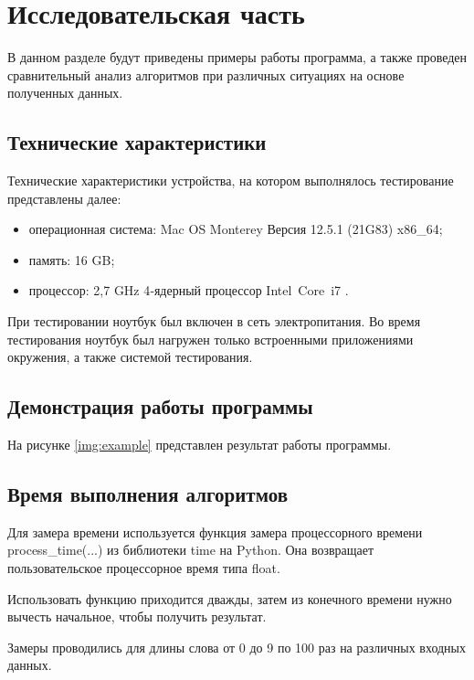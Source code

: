 \chapter{Исследовательская часть}

В данном разделе будут приведены примеры работы программа, а также проведен сравнительный анализ алгоритмов при различных ситуациях на основе полученных данных.

\section{Технические характеристики}

Технические характеристики устройства, на котором выполнялось тестирование представлены далее:

\begin{itemize}
    \item операционная система: Mac OS Monterey Версия 12.5.1 (21G83) \cite{macos} x86\_64;
    \item память: 16 GB;
    \item процессор: 2,7 GHz 4‑ядерный процессор Intel Core i7 \cite{intel}.
\end{itemize}

При тестировании ноутбук был включен в сеть электропитания. Во время тестирования ноутбук был нагружен только встроенными приложениями окружения, а также системой тестирования.

\section{Демонстрация работы программы}

На рисунке \ref{img:example} представлен результат работы программы.

\clearpage

\section{Время выполнения алгоритмов}

Для замера времени используется функция замера процессорного времени process\_time(...) из библиотеки time на Python. Она возвращает пользовательское процессорное время типа float.

Использовать функцию приходится дважды, затем из конечного времени нужно вычесть начальное, чтобы получить результат.

Замеры проводились для длины слова от 0 до 9 по 100 раз на различных входных данных.

